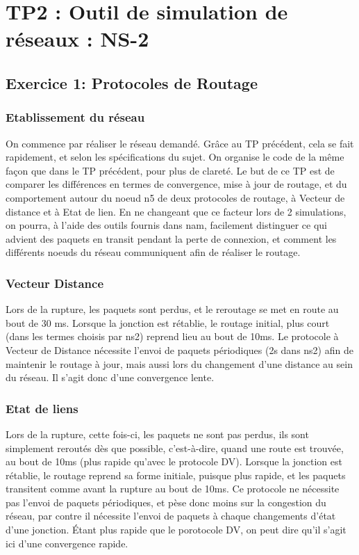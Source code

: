 
\chapter{TP2 : Outil de simulation de réseaux : NS-2}

    \section{Exercice 1: Protocoles de Routage}
    \subsection{Etablissement du réseau}
      On commence par réaliser le réseau demandé. Grâce au TP précédent, cela se fait rapidement, et selon les spécifications du sujet. On organise le code de la même façon que dans le TP précédent, pour plus de clareté. Le but de ce TP est de comparer les différences en termes de convergence, mise à jour de routage, et du comportement autour du noeud n5 de deux protocoles de routage, à Vecteur de distance et à Etat de lien. En ne changeant que ce facteur lors de 2 simulations, on pourra, à l'aide des outils fournis dans nam, facilement distinguer ce qui advient des paquets en transit pendant la perte de connexion, et comment les différents noeuds du réseau communiquent afin de réaliser le routage.
    \subsection{Vecteur Distance}
      Lors de la rupture, les paquets sont perdus, et le reroutage se met en route au bout de 30 ms. Lorsque la jonction est rétablie, le routage initial, plus court (dans les termes choisis par ns2) reprend lieu au bout de 10ms. Le protocole à Vecteur de Distance nécessite l'envoi de paquets périodiques (2s dans ns2) afin de maintenir le routage à jour, mais aussi lors du changement d'une distance au sein du réseau. Il s'agit donc d'une convergence lente.
    \subsection{Etat de liens}
      Lors de la rupture, cette fois-ci, les paquets ne sont pas perdus, ils sont simplement reroutés dès que possible, c'est-à-dire, quand une route est trouvée, au bout de 10ms (plus rapide qu'avec le protocole DV). Lorsque la jonction est rétablie, le routage reprend sa forme initiale, puisque plus rapide, et les paquets transitent comme avant la rupture au bout de 10ms. Ce protocole ne nécessite pas l'envoi de paquets périodiques, et pèse donc moins sur la congestion du réseau, par contre il nécessite l'envoi de paquets à chaque changements d'état d'une jonction. Étant plus rapide que le porotocole DV, on peut dire qu'il s'agit ici d'une convergence rapide.
